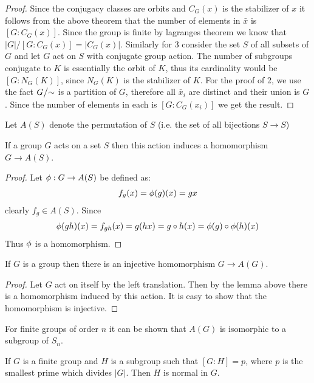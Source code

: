 \begin{proof}
  Since the conjugacy classes are orbits and $C_G(x)$ is the stabilizer of $x$ it follows from the above theorem that the number of elements in $\bar{x}$ is $[G:C_G(x)]$. Since the group is finite by lagranges theorem we know that $|G|/[G:C_G(x)] = |C_G(x)|$. Similarly for 3 consider the set $S$ of all subsets of $G$ and let $G$ act on $S$ with conjugate group action. The number of subgroups conjugate to $K$ is essentially the orbit of $K$, thus its cardinality would be $[G:N_G(K)]$, since $N_G(K)$ is the stabilizer of $K$. For the proof of 2, we use the fact $G\bign/\sim$ is a partition of $G$, therefore all $\bar{x}_i$ are distinct and their union is $G$. Since the number of elements in each is $[G:C_G(x_i)]$ we get the result.
\end{proof}
\begin{definition}
  Let $A(S)$ denote the permutation of $S$ (i.e. the set of all bijections $S\to S$)
\end{definition}
\begin{lemma}
  If a group $G$ acts on a set $S$ then this action induces a homomorphism $G\to A(S)$.
\end{lemma}
\begin{proof}
  Let $\phi:G\to A(S)$ be defined as:
  \begin{align*}
    f_g(x) = \phi(g)(x) = gx 
  \end{align*}
  clearly $f_g\in A(S)$. Since
  \begin{align*}
    \phi(gh)(x) = f_{gh}(x) = g(hx) = g\circ h(x) = \phi(g)\circ \phi(h)(x)
  \end{align*}
  Thus $\phi$ is a homomorphism.
\end{proof}
\begin{theorem}
  If $G$ is a group then there is an injective homomorphism $G\to A(G)$.
\end{theorem}
\begin{proof}
  Let $G$ act on itself by the left translation. Then by the lemma above there is a homomorphism induced by this action. It is easy to show that the homomorphism is injective.
\end{proof}
\begin{remark}
  For finite groups of order $n$ it can be shown that $A(G)$ is isomorphic to a subgroup of $S_n$.
\end{remark}
\begin{proposition}
  If $G$ is a finite group and $H$ is a subgroup such that $[G:H] = p$, where $p$ is the smallest prime which divides $|G|$. Then $H$ is normal in $G$.
\end{proposition}
